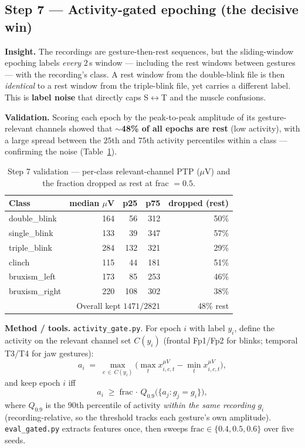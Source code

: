 \documentclass[11pt,a4paper]{article}
\newcommand{\muv}{$\mu$V}
\newcommand{\code}[1]{\texttt{#1}}
\begin{document}
\subsection{Step 7 --- Activity-gated epoching (the decisive win)}
\label{sec:step7}
\textbf{Insight.} The recordings are gesture-then-rest sequences, but the
sliding-window epoching labels \emph{every} $2$\,s window --- including the rest
windows between gestures --- with the recording's class. A rest window from the
double-blink file is then \emph{identical} to a rest window from the triple-blink
file, yet carries a different label. This is \textbf{label noise} that directly
caps S$\leftrightarrow$T and the muscle confusions.

\textbf{Validation.} Scoring each epoch by the peak-to-peak amplitude of its
gesture-relevant channels showed that \textbf{$\sim$48\% of all epochs are rest}
(low activity), with a large spread between the $25$th and $75$th activity
percentiles within a class --- confirming the noise (Table~\ref{tab:step7val}).

\begin{table}[h]\centering\small
\caption{Step 7 validation --- per-class relevant-channel PTP (\muv) and the
fraction dropped as rest at frac $=0.5$.}
\label{tab:step7val}
\begin{tabular}{@{}lrrrr@{}}
\toprule
Class & median \muv & p25 & p75 & dropped (rest) \\
\midrule
double\_blink  & 164 & 56  & 312 & 50\% \\
single\_blink  & 133 & 39  & 347 & 57\% \\
triple\_blink  & 284 & 132 & 321 & 29\% \\
clinch         & 115 & 44  & 181 & 51\% \\
bruxism\_left  & 173 & 85  & 253 & 46\% \\
bruxism\_right & 220 & 108 & 302 & 38\% \\
\midrule
\multicolumn{4}{r}{Overall kept $1471/2821$} & 48\% rest \\
\bottomrule
\end{tabular}
\end{table}

\textbf{Method / tools.} \code{activity\_gate.py}. For epoch $i$ with label
$y_i$, define the activity on the relevant channel set $C(y_i)$ (frontal
Fp1/Fp2 for blinks; temporal T3/T4 for jaw gestures):
\[
a_i \;=\; \max_{c\,\in\,C(y_i)}\Big(\max_t x^{\mu V}_{i,c,t}-\min_t x^{\mu V}_{i,c,t}\Big),
\]
and keep epoch $i$ iff
\[
a_i \;\ge\; \text{frac}\,\cdot\, Q_{0.9}\big(\{a_j : g_j = g_i\}\big),
\]
where $Q_{0.9}$ is the $90$th percentile of activity \emph{within the same
recording} $g_i$ (recording-relative, so the threshold tracks each gesture's own
amplitude). \code{eval\_gated.py} extracts features once, then sweeps
$\text{frac}\in\{0.4,0.5,0.6\}$ over five seeds.
\end{document}
